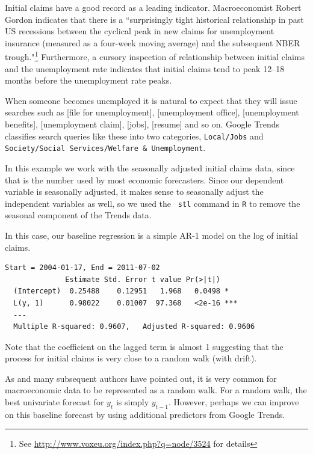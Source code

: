 \documentclass[12pt, oneside]{article}
\begin{document}
Initial claims have a good record as a leading
indicator. Macroeconomist Robert Gordon indicates that there is a
``surprisingly tight historical relationship in past US recessions
between the cyclical peak in new claims for unemployment insurance
(measured as a four-week moving average) and the subsequent NBER
trough."\footnote{See \url{http://www.voxeu.org/index.php?q=node/3524}
  for details} Furthermore, a cursory inspection of relationship
between initial claims and the unemployment rate indicates that
initial claims tend to peak 12--18 months before the unemployment rate
peaks.

When someone becomes unemployed it is natural to expect that they will
issue searches such as [file for unemployment], [unemployment office],
[unemployment benefits], [unemployment claim], [jobs], [resume] and so
on. Google Trends classifies search queries like these into two
categories, {\tt Local/Jobs} and {\tt Society/Social Services/Welfare \&
Unemployment}.

In this example we work with the seasonally adjusted initial claims
data, since that is the number used by most economic forecasters.
Since our dependent variable is seasonally adjusted, it makes sense to
seasonally adjust the independent variables as well, so we used the {\tt
  stl} command in {\tt R} to remove the seasonal component of the
Trends data.  

In this case, our baseline regression is a simple AR-1 model on the log
of initial claims.

\small
\begin{verbatim}
Start = 2004-01-17, End = 2011-07-02
              Estimate Std. Error t value Pr(>|t|)    
  (Intercept)  0.25488    0.12951   1.968   0.0498 *  
  L(y, 1)      0.98022    0.01007  97.368   <2e-16 ***
  ---
  Multiple R-squared: 0.9607,	Adjusted R-squared: 0.9606 
\end{verbatim}
\normalsize

Note that the coefficient on the lagged term is almost 1 suggesting
that the process for initial claims is very close to a random walk
(with drift).

As \cite{Nelson82} and many subsequent authors have pointed out, it is
very common for macroeconomic data to be represented as a random walk.
For a random walk, the best univariate forecast for $y_t$ is simply
$y_{t-1}$.  However, perhaps we can improve on this baseline forecast
by using additional predictors from Google Trends.
\end{document}
